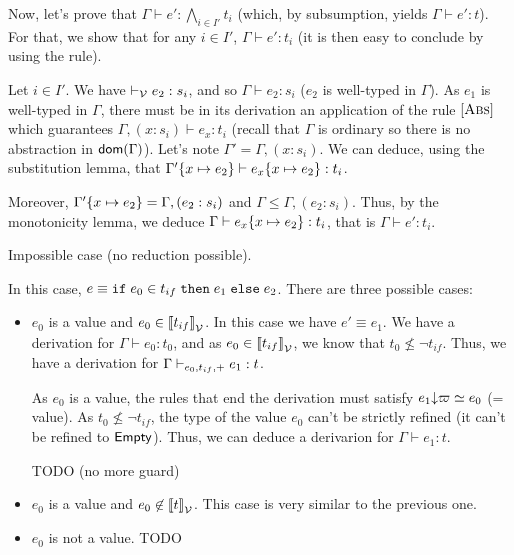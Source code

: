 \documentclass[a4paper]{article}
\theoremstyle{definition}
\begin{document}
\begin{description}
\begin{itemize}
            Now, let's prove that $\Gamma \vdash e':\bigwedge_{i\in I'} t_i$ (which, by subsumption,
            yields $\Gamma \vdash e': t$). For that, we show that for any $i\in I'$, $\Gamma \vdash e':t_i$
            (it is then easy to conclude by using the  rule).

            Let $i\in I'$. We have $\vvdash e_2:s_i$, and so $\Gamma \vdash e_2:s_i$ ($e_2$ is well-typed in $\Gamma$).
            As $e_1$ is well-typed in $\Gamma$, there must be in its derivation an application of the rule $\Rule{Abs}$
            which guarantees $\Gamma,(x:s_i) \vdash e_x:t_i$ (recall that $\Gamma$ is ordinary so there is no abstraction in $\dom\Gamma$).
            Let's note $\Gamma'=\Gamma,(x:s_i)$.
            We can deduce, using the substitution lemma, that $\Gamma'\subst x {e_2} \vdash e_x\subst x {e_2}: t_i$.
           
            Moreover, $\Gamma'\subst x {e_2} = \Gamma,(e_2:s_i)$ and $\Gamma \leq \Gamma,(e_2:s_i)$.
            Thus, by the monotonicity lemma, we deduce $\Gamma \vdash e_x\subst x {e_2}: t_i$,
            that is $\Gamma \vdash e': t_i$.
          \end{itemize}
          \item[\Rule{Abs}] Impossible case (no reduction possible).
          \item[\Rule{If}] In this case, $e\equiv \ite {e_0} {t_{if}} {e_1} {e_2}$. There are three possible cases:
          \begin{itemize}
            \item $e_0$ is a value and $e_0 \in \valsemantic{t_{if}}$. In this case we have $e' \equiv e_1$.
            We have a derivation for $\Gamma \vdash e_0: t_0$, and as $e_0 \in \valsemantic{t_{if}}$, we know
            that $t_0 \not\leq \neg t_{if}$. Thus, we have a derivation for $\Gamma \cvdash + {e_0} {t_{if}} e_1 : t$.

            As $e_0$ is a value, the  rules that end the derivation must satisfy $\occ {e_1} \varpi \simeq e_0$ (= value).
            As $t_0 \not\leq \neg t_{if}$, the type of the value $e_0$ can't be strictly refined (it can't be refined to $\Empty$).
            Thus, we can deduce a derivarion for $\Gamma \vdash e_1: t$.

            TODO (no more guard)
            \item $e_0$ is a value and $e_0 \not\in \valsemantic{t}$. This case is very similar to the previous one.
            \item $e_0$ is not a value. TODO
          \end{itemize}
        \end{description}
\end{document}
